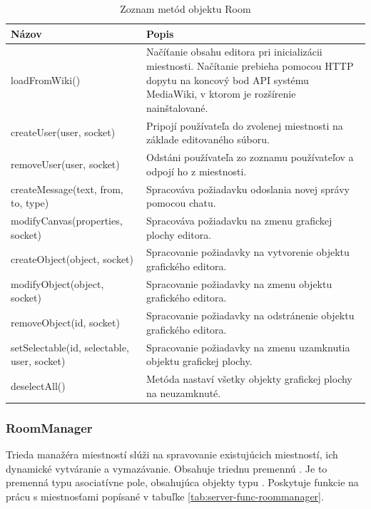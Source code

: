 \begin{table}
	\begin{tabular}{ | m{6cm} | m{6.5cm} | } \hline
		\textbf{Názov} & \textbf{Popis} \\ \hline \hline
		
		loadFromWiki() & Načíťanie obsahu editora pri inicializácii miestnosti. Načítanie prebieha pomocou HTTP dopytu na koncový bod API systému MediaWiki, v ktorom je rozšírenie nainštalované. \\\hline
		createUser(user, socket) & Pripojí používateľa do zvolenej miestnosti na základe editovaného súboru. \\\hline
		removeUser(user, socket) & Odstáni používateľa zo zoznamu používateľov a odpojí ho z miestnosti.  \\\hline
		createMessage(text, from, to, type) & Spracováva požiadavku odoslania novej správy pomocou chatu. \\\hline
		modifyCanvas(properties, socket) & Spracováva požiadavku na zmenu grafickej plochy editora. \\\hline
		createObject(object, socket) & Spracovanie požiadavky na vytvorenie objektu grafického editora. \\\hline
		modifyObject(object, socket) & Spracovanie požiadavky na zmenu objektu grafického editora. \\\hline
		removeObject(id, socket) & Spracovanie požiadavky na odstránenie objektu grafického editora. \\\hline
		setSelectable(id, selectable, user, socket) & Spracovanie požiadavky na zmenu uzamknutia objektu grafickej plochy. \\\hline
		deselectAll() & Metóda nastaví všetky objekty grafickej plochy na neuzamknuté. \\\hline
		
		\hline
	\end{tabular}
	\caption{Zoznam metód objektu Room}
	\label{tab:server-func-room}
\end{table}


\subsubsection{RoomManager}
Trieda manažéra miestností  slúži na spravovanie existujúcich miestností, ich dynamické vytváranie a vymazávanie. Obsahuje triednu premennú . Je to premenná typu asociatívne pole, obsahujúca objekty typu . Poskytuje funkcie na prácu s miestnosťami popísané v tabuľke \ref{tab:server-func-roommanager}.

